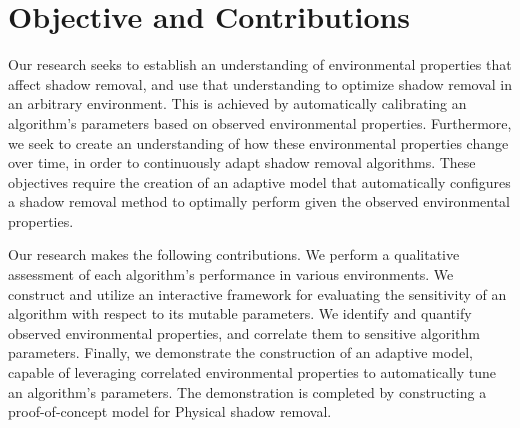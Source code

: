 

\FloatBarrier
\section{Objective and Contributions}

Our research seeks to establish an understanding of environmental properties that affect shadow removal, and use that understanding to optimize shadow removal in an arbitrary environment. This is achieved by automatically calibrating an algorithm's parameters based on observed environmental properties. Furthermore, we seek to create an understanding of how these environmental properties change over time, in order to continuously adapt shadow removal algorithms. These objectives require the creation of an adaptive model that automatically configures a shadow removal method to optimally perform given the observed environmental properties.

Our research makes the following contributions. We perform a qualitative assessment of each algorithm's performance in various environments. We construct and utilize an interactive framework for evaluating the sensitivity of an algorithm with respect to its mutable parameters. We identify and quantify observed environmental properties, and correlate them to sensitive algorithm parameters. Finally, we demonstrate the construction of an adaptive model, capable of leveraging correlated environmental properties to automatically tune an algorithm's parameters. The demonstration is completed by constructing a proof-of-concept model for Physical shadow removal.

